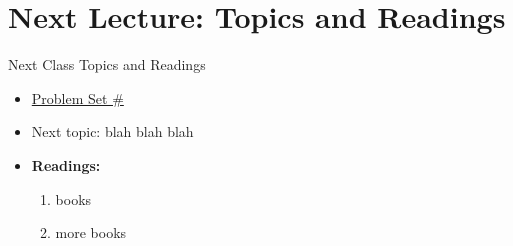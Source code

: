 \documentclass[fleqn, 10pt]{beamer}
\begin{document}
\section{Next Lecture: Topics and Readings}

\begin{frame}{Next Class Topics and Readings}
	
	\begin{itemize}
		\item \underline{Problem Set \#}
		\item Next topic: blah blah blah
		\item \textbf{Readings:}
		\begin{enumerate}
			\item books
			\item more books
		\end{enumerate}
	\end{itemize}
	
\end{frame}
\end{document}

